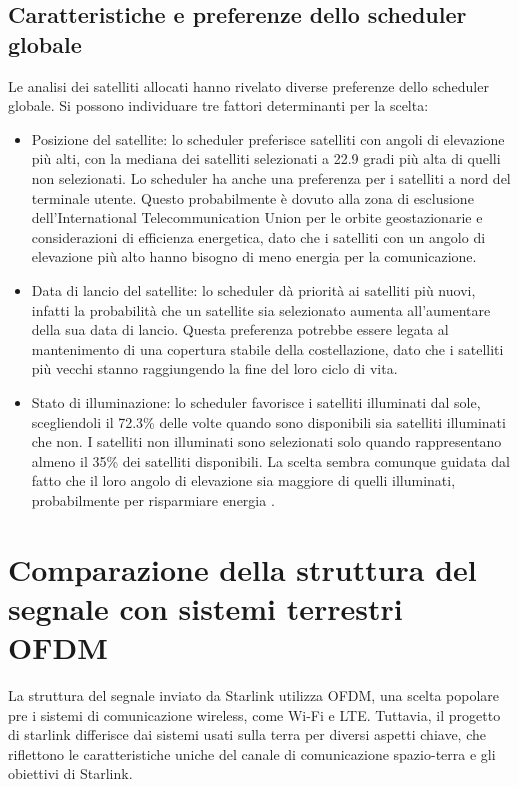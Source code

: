 \subsection{Caratteristiche e preferenze dello scheduler globale}
Le analisi dei satelliti allocati hanno rivelato diverse preferenze dello scheduler globale. Si possono individuare tre fattori determinanti per la scelta:
\begin{itemize}
  \item Posizione del satellite: lo scheduler preferisce satelliti con angoli di elevazione più alti, con la mediana dei satelliti selezionati a 22.9 gradi più alta di quelli non selezionati.
  Lo scheduler ha anche una preferenza per i satelliti a nord del terminale utente. Questo probabilmente è dovuto alla zona di esclusione dell'International Telecommunication Union per le orbite geostazionarie e considerazioni di efficienza energetica, dato che i satelliti con un angolo di elevazione più alto hanno bisogno di meno energia per la comunicazione.
  \item Data di lancio del satellite: lo scheduler dà priorità ai satelliti più nuovi, infatti la probabilità che un satellite sia selezionato aumenta all'aumentare della sua data di lancio. Questa preferenza potrebbe essere legata al mantenimento di una copertura stabile della costellazione, dato che i satelliti più vecchi stanno raggiungendo la fine del loro ciclo di vita.
  \item Stato di illuminazione: lo scheduler favorisce i satelliti illuminati dal sole, scegliendoli il 72.3\% delle volte quando sono disponibili sia satelliti illuminati che non. I satelliti non illuminati sono selezionati solo quando rappresentano almeno il 35\% dei satelliti disponibili. La scelta sembra comunque guidata dal fatto che il loro angolo di elevazione sia maggiore di quelli illuminati, probabilmente per risparmiare energia \cite{tanveer_making_2023}.
\end{itemize}

\section{Comparazione della struttura del segnale con sistemi terrestri OFDM}
La struttura del segnale inviato da Starlink utilizza \ac{OFDM}, una scelta popolare pre i sistemi di comunicazione wireless, come Wi-Fi e LTE.
Tuttavia, il progetto di starlink differisce dai sistemi usati sulla terra per diversi aspetti chiave, che riflettono le caratteristiche uniche del canale di comunicazione spazio-terra e gli obiettivi di Starlink.

